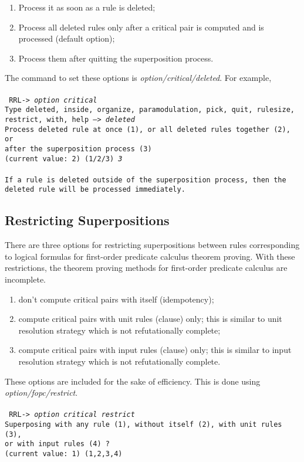 \begin{enumerate}
\item Process it as soon as a rule is deleted;
\item Process all deleted rules only after a critical pair is computed
and is processed (default option);
\item Process them after quitting the superposition process.
\end{enumerate}
The command to set these options is {\em option/critical/deleted}. 
For example,\\ \\
\tt
RRL-> {\em option critical}\\
Type deleted, inside, organize, paramodulation, pick, quit, rulesize, \\
\hspace*{0.4in} 
     restrict, with, help --> {\em deleted} \\
Process deleted rule at once (1), or all deleted rules together (2), or \\
after the superposition process (3) \\
(current value: 2) (1/2/3) {\em 3} \\
\rm
\\ If a rule is deleted outside of the superposition process, then 
the deleted rule will be processed immediately.

\subsection{Restricting Superpositions}

There are three options for restricting superpositions
between rules corresponding
to logical formulas for first-order
predicate calculus theorem proving. With these restrictions,
the theorem proving methods for first-order predicate calculus are
incomplete.
\begin{enumerate}
\item don't compute critical pairs with itself (idempotency);
\item compute critical pairs with unit rules (clause)
only; this is similar to unit resolution
strategy which is not refutationally complete;
\item compute critical pairs with input rules (clause)
only; this is similar to input resolution
strategy which is not refutationally complete.
\end{enumerate}

These options are included for the sake of efficiency.
This is done using {\em option/fopc/restrict}.\\ \\
\tt
RRL-> {\em option critical restrict} \\
Superposing with any rule (1), without itself (2), with unit rules (3), \\
\hspace*{0.4in} 
    or with input rules (4) ? \\
(current value: 1) (1,2,3,4) 
\rm

